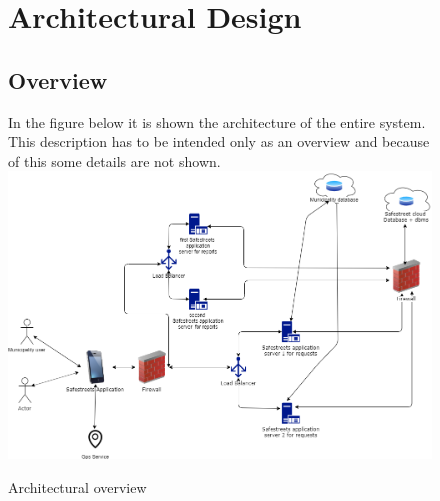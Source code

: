 \documentclass[titlepage]{article}
\begin{document}
\begin{figure}[h]
\section{Architectural Design}
	\subsection{Overview}
In the figure below it is shown the architecture of the entire system. This description has to be intended only as an overview and because of this some details are not shown.
	\includegraphics[scale=0.465]{Diagrams/overview.png}
	\caption{Architectural overview}
\end{figure}
\FloatBarrier
\end{document}
